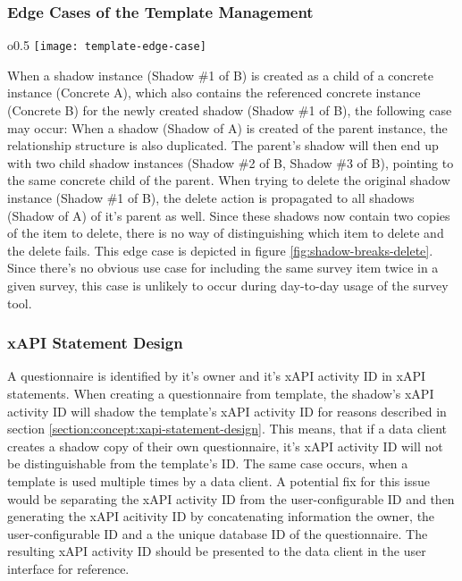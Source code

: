     	\subsubsection{Edge Cases of the Template Management}
    		\begin{wrapfigure}{o}{0.5\textwidth}
    			\centering
    			\texttt{[image: template-edge-case]}
    			\caption{Using a shadow instance inside the source concrete breaks the delete action}
    			\label{fig:shadow-breaks-delete}
    		\end{wrapfigure}

    		When a shadow instance (Shadow \#1 of B) is created as a child of a concrete instance (Concrete A), which also contains the referenced
    		concrete instance (Concrete B) for the newly created shadow (Shadow \#1 of B), the following case may occur: When a shadow (Shadow of A) is created
    		of the parent instance, the relationship structure is also duplicated. The parent's shadow will
    		then end up with two child shadow instances (Shadow \#2 of B, Shadow \#3 of B), pointing to the same concrete child of the parent.
    		When trying to delete the original shadow instance (Shadow \#1 of B), the delete action is propagated to all
    		shadows (Shadow of A) of it's parent as well. Since these shadows now contain two copies of the
    		item to delete, there is no way of distinguishing which item to delete and the delete fails.
    		This edge case is depicted in figure \ref{fig:shadow-breaks-delete}.
    		Since there's no obvious use case for including the same survey item twice in a given survey,
    		this case is unlikely to occur during day-to-day usage of the survey tool.

    	\subsubsection{xAPI Statement Design}
    		A questionnaire is identified by it's owner and it's xAPI activity ID in xAPI statements.
    		When creating a questionnaire from template, the shadow's xAPI activity ID will shadow
    		the template's xAPI activity ID for reasons described in section \ref{section:concept:xapi-statement-design}.
    		This means, that if a data client creates a shadow copy of their own
    		questionnaire, it's xAPI activity ID will not be distinguishable from
    		the template's ID. The same case occurs, when a template is used multiple times
    		by a data client. A potential fix for this issue would be
    		separating the xAPI activity ID from the user-configurable ID and
    		then generating the xAPI acitivity ID by concatenating information
    		the owner, the user-configurable ID and a the unique database ID
    		of the questionnaire. The resulting xAPI activity ID should be presented to the data client
    		in the user interface for reference.

